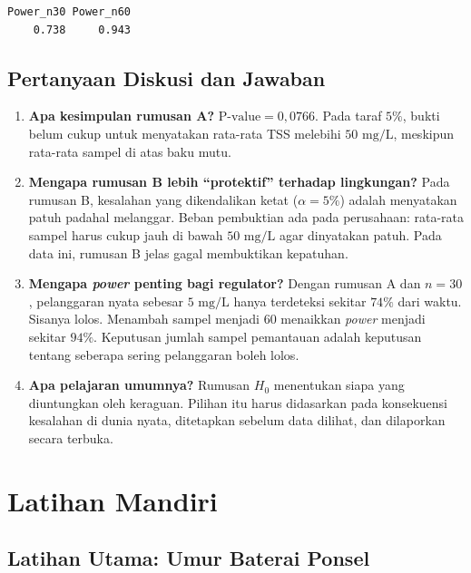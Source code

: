 \documentclass[
  indonesian,
  letterpaper,
]{book}
\providecommand{\tightlist}{%
  \setlength{\itemsep}{0pt}\setlength{\parskip}{0pt}}
\begin{document}
\begin{verbatim}
Power_n30 Power_n60 
    0.738     0.943 
\end{verbatim}

\subsection{Pertanyaan Diskusi dan
Jawaban}\label{pertanyaan-diskusi-dan-jawaban-6}

\begin{enumerate}
\def\labelenumi{\arabic{enumi}.}
\tightlist
\item
  \textbf{Apa kesimpulan rumusan A?} \(\text{P-value} = 0{,}0766\). Pada
  taraf \(5\%\), bukti belum cukup untuk menyatakan rata-rata TSS
  melebihi \(50\text{ mg/L}\), meskipun rata-rata sampel di atas baku
  mutu.
\item
  \textbf{Mengapa rumusan B lebih ``protektif'' terhadap lingkungan?}
  Pada rumusan B, kesalahan yang dikendalikan ketat (\(\alpha = 5\%\))
  adalah menyatakan patuh padahal melanggar. Beban pembuktian ada pada
  perusahaan: rata-rata sampel harus cukup jauh di bawah
  \(50\text{ mg/L}\) agar dinyatakan patuh. Pada data ini, rumusan B
  jelas gagal membuktikan kepatuhan.
\item
  \textbf{Mengapa \emph{power} penting bagi regulator?} Dengan rumusan A
  dan \(n = 30\), pelanggaran nyata sebesar \(5\text{ mg/L}\) hanya
  terdeteksi sekitar \(74\%\) dari waktu. Sisanya lolos. Menambah sampel
  menjadi \(60\) menaikkan \emph{power} menjadi sekitar \(94\%\).
  Keputusan jumlah sampel pemantauan adalah keputusan tentang seberapa
  sering pelanggaran boleh lolos.
\item
  \textbf{Apa pelajaran umumnya?} Rumusan \(H_0\) menentukan siapa yang
  diuntungkan oleh keraguan. Pilihan itu harus didasarkan pada
  konsekuensi kesalahan di dunia nyata, ditetapkan sebelum data dilihat,
  dan dilaporkan secara terbuka.
\end{enumerate}

\section{Latihan Mandiri}\label{latihan-mandiri-6}

\subsection{Latihan Utama: Umur Baterai
Ponsel}\label{latihan-utama-umur-baterai-ponsel}
\end{document}
